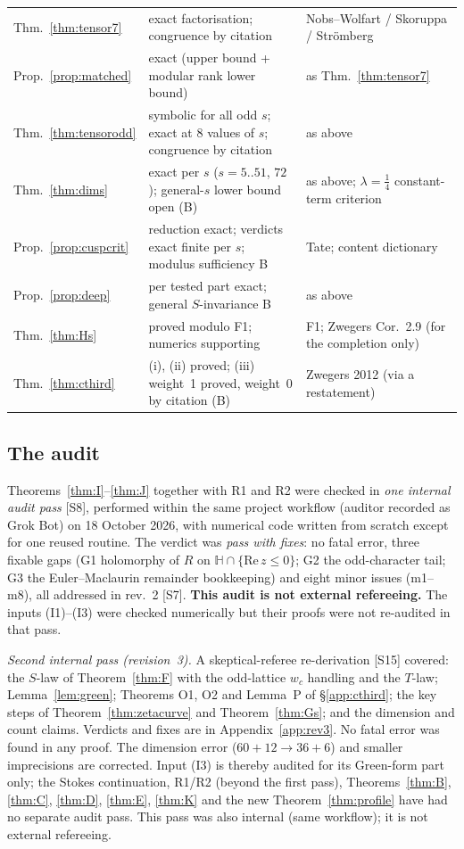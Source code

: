 \documentclass[11pt]{article}
\theoremstyle{definition}
\theoremstyle{plain}
\newcommand{\Hb}{\mathbb{H}}
\newcommand{\src}[1]{\textup{[S#1]}}
\begin{document}
\begin{center}
\begin{longtable}{p{2.6cm}p{6.6cm}p{5.6cm}}
Thm.~\ref{thm:tensor7} & exact factorisation; congruence by citation & Nobs--Wolfart / Skoruppa / Str\"omberg\\
Prop.~\ref{prop:matched} & exact (upper bound + modular rank lower bound) & as Thm.~\ref{thm:tensor7}\\
Thm.~\ref{thm:tensorodd} & symbolic for all odd $s$; exact at $8$ values of $s$; congruence by citation & as above\\
Thm.~\ref{thm:dims} & exact per $s$ ($s=5..51$, $72$); general-$s$ lower bound open (B) & as above; $\lambda=\tfrac14$ constant-term criterion\\
Prop.~\ref{prop:cuspcrit} & reduction exact; verdicts exact finite per $s$; modulus sufficiency B & Tate; content dictionary\\
Prop.~\ref{prop:deep} & per tested part exact; general $S$-invariance B & as above\\
Thm.~\ref{thm:Hs} & proved modulo F1; numerics supporting & F1; Zwegers Cor.~2.9 (for the completion only)\\
Thm.~\ref{thm:cthird} & (i), (ii) proved; (iii) weight~1 proved, weight~0 by citation (B) & Zwegers 2012 (via a restatement)\\\bottomrule
\end{longtable}
\end{center}

\subsection{The audit}\label{sec:audit}
Theorems~\ref{thm:I}--\ref{thm:J} together with R1 and R2 were checked in \emph{one internal audit pass} \src{8}, performed within the same project
workflow (auditor recorded as Grok Bot) on 18 October 2026, with numerical code written from scratch except for one reused routine. The verdict was
\emph{pass with fixes}: no fatal error, three fixable gaps (G1 holomorphy of $R$ on $\Hb\cap\{\mathrm{Re}\,z\le0\}$; G2 the odd-character tail; G3
the Euler--Maclaurin remainder bookkeeping) and eight minor issues (m1--m8), all addressed in rev.~2 \src{7}. \textbf{This audit is not external
refereeing.} The inputs (I1)--(I3) were checked numerically but their proofs were not re-audited in that pass.

\emph{Second internal pass (revision~3).} A skeptical-referee re-derivation \src{15} covered: the $S$-law of Theorem~\ref{thm:F} with the odd-lattice
$w_c$ handling and the $T$-law; Lemma~\ref{lem:green}; Theorems O1, O2 and Lemma~P of \S\ref{app:cthird}; the key steps of
Theorem~\ref{thm:zetacurve} and Theorem~\ref{thm:Gs}; and the dimension and count claims. Verdicts and fixes are in Appendix~\ref{app:rev3}. No fatal
error was found in any proof. The dimension error ($60+12\to36+6$) and smaller imprecisions are corrected. Input (I3) is thereby audited for its Green-form part
only; the Stokes continuation, R1/R2 (beyond the first pass), Theorems~\ref{thm:B}, \ref{thm:C}, \ref{thm:D}, \ref{thm:E}, \ref{thm:K} and the new
Theorem~\ref{thm:profile} have had no separate audit pass. This pass was also internal (same workflow); it is not external refereeing.
\end{document}
